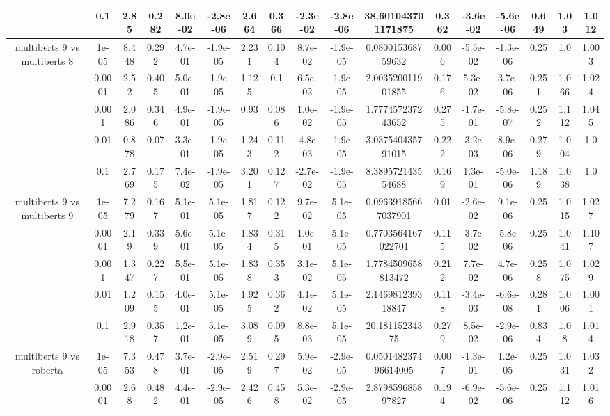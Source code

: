 \begin{tabular}{|c|c|c|c|c|c|c|c|c|c|c|c|c|c|c|c|c|}
 & 0.1 & 2.85 & 0.282 & 8.0e-02 & -2.8e-06 & 2.664 & 0.366 & -2.3e-02 & -2.8e-06 & 38.601043701171875 & 0.362 & -3.6e-02 & -5.6e-06 & 0.649 & 1.03 & 1.012 \\
\hline
\multirow{5}{*}{multiberts 9 vs multiberts 8} & 1e-05 & 8.448 & 0.292 & 4.7e-01 & -1.9e-05 & 2.231 & 0.104 & 8.7e-02 & -1.9e-05 & 0.080015368759632 & 0.006 & -5.5e-02 & -1.3e-06 & 0.25 & 1.0 & 1.003 \\
 & 0.0001 & 2.52 & 0.405 & 5.0e-01 & -1.9e-05 & 1.125 & 0.1 & 6.5e-02 & -1.9e-05 & 2.003520011901855 & 0.176 & 5.3e-02 & 3.7e-06 & 0.251 & 1.066 & 1.024 \\
 & 0.001 & 2.086 & 0.346 & 4.9e-01 & -1.9e-05 & 0.93 & 0.086 & 1.0e-02 & -1.9e-05 & 1.777457237243652 & 0.275 & -1.7e-01 & -5.8e-07 & 0.252 & 1.112 & 1.045 \\
 & 0.01 & 0.878 & 0.07 & 3.3e-01 & -1.9e-05 & 1.243 & 0.112 & -4.8e-03 & -1.9e-05 & 3.037540435791015 & 0.222 & -3.2e-03 & 8.9e-06 & 0.279 & 1.004 & 1.0 \\
 & 0.1 & 2.769 & 0.175 & 7.4e-02 & -1.9e-05 & 3.201 & 0.127 & -2.7e-02 & -1.9e-05 & 8.389572143554688 & 0.169 & 1.3e-01 & -5.0e-06 & 1.189 & 1.038 & 1.0 \\
\hline
\multirow{5}{*}{multiberts 9 vs multiberts 9} & 1e-05 & 7.279 & 0.167 & 5.1e-01 & 5.1e-05 & 1.817 & 0.122 & 9.7e-02 & 5.1e-05 & 0.09639185667037901 & 0.01 & -2.6e-02 & 9.1e-06 & 0.25 & 1.015 & 1.027 \\
 & 0.0001 & 2.19 & 0.339 & 5.6e-01 & 5.1e-05 & 1.834 & 0.315 & 1.0e-01 & 5.1e-05 & 0.7703564167022701 & 0.115 & -3.7e-02 & -5.8e-06 & 0.25 & 1.041 & 1.107 \\
 & 0.001 & 1.347 & 0.227 & 5.5e-01 & 5.1e-05 & 1.838 & 0.353 & 3.1e-02 & 5.1e-05 & 1.7784509658813472 & 0.212 & 7.7e-02 & 4.7e-06 & 0.258 & 1.075 & 1.029 \\
 & 0.01 & 1.209 & 0.155 & 4.0e-01 & 5.1e-05 & 1.925 & 0.362 & 4.1e-02 & 5.1e-05 & 2.146981239318847 & 0.118 & -3.4e-03 & -6.6e-08 & 0.281 & 1.006 & 1.001 \\
 & 0.1 & 2.918 & 0.357 & 1.2e-01 & 5.1e-05 & 3.089 & 0.095 & 8.8e-03 & 5.1e-05 & 20.18115234375 & 0.279 & 8.5e-02 & -2.9e-06 & 0.834 & 1.08 & 1.014 \\
\hline
\multirow{5}{*}{multiberts 9 vs roberta } & 1e-05 & 7.353 & 0.478 & 3.7e-01 & -2.9e-05 & 2.519 & 0.297 & 5.9e-02 & -2.9e-05 & 0.050148237496614005 & 0.007 & -1.3e-01 & 1.2e-05 & 0.25 & 1.031 & 1.032 \\
 & 0.0001 & 2.68 & 0.482 & 4.4e-01 & -2.9e-05 & 2.426 & 0.458 & 5.3e-02 & -2.9e-05 & 2.879859685897827 & 0.194 & -6.9e-02 & -5.6e-06 & 0.25 & 1.112 & 1.016 \\

\end{tabular}
